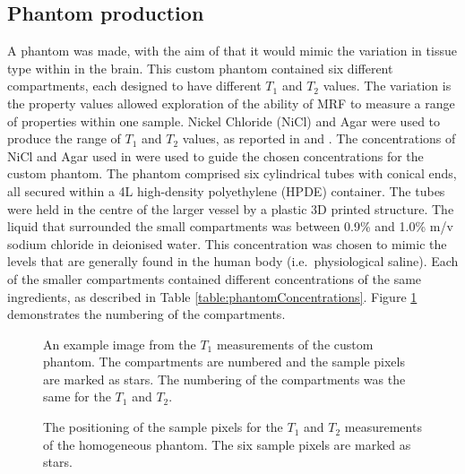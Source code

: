 \documentclass[journal]{IEEEtran}
\newlength\figureheight
\newlength\figurewidth
\begin{document}
\subsection{Phantom production}
A phantom was made, with the aim of that it would mimic the variation in tissue type within in the brain.
This custom phantom contained six different compartments, each designed to have different $T_1$ and $T_2$ values.
The variation is the property values allowed exploration of the ability of MRF to measure a range of properties within one sample. Nickel Chloride (NiCl) and Agar were used to produce the range of $T_1$ and $T_2$ values, as reported in \cite{cochlin2003dependence} and \cite{zhu2005full}. The concentrations of NiCl and Agar used in \cite{zhu2005full} were used to guide the chosen concentrations for the custom phantom. The phantom comprised six cylindrical tubes with conical ends, all secured within a 4L high-density polyethylene (HPDE) container. The tubes were held in the centre of the larger vessel by a plastic 3D printed structure. The liquid that surrounded the small compartments was between 0.9\% and 1.0\% m/v sodium chloride in deionised water. This concentration was chosen to mimic the levels that are generally found in the human body (i.e.\ physiological saline).  Each of the smaller compartments contained different concentrations of the same ingredients, as described in Table \ref{table:phantomConcentrations}.
Figure \ref{fig:JackTILabels} demonstrates the numbering of the compartments.



\begin{figure}
\centering
\begin{minipage}[c]{\columnwidth}
\setlength{}
\setlength{}



    \caption{An example image from the $T_1$ measurements of the custom phantom. The compartments are numbered and the sample pixels are marked as stars. The numbering of the compartments was the same for the $T_1$ and $T_2$.}
    \label{fig:JackTILabels}
\end{minipage}
\end{figure}

\begin{figure}
\centering
\begin{minipage}[c]{\columnwidth}
\setlength{}
\setlength{}



    \caption{The positioning of the sample pixels for the $T_1$ and $T_2$ measurements of the homogeneous phantom. The six sample pixels are marked as stars.}
    \label{fig:sphereD170TILabels}
\end{minipage}
\end{figure}
\end{document}
